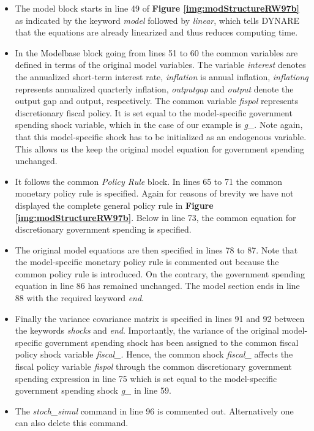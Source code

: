 \begin{itemize}
\item The model block starts in line 49 of {\bf Figure \ref{img:modStructureRW97b}} as indicated by the keyword \textit{model} followed
by \textit{linear}, which tells DYNARE that the equations are already linearized and thus reduces computing time.
\item In the Modelbase block going from lines 51 to 60 the common variables are defined in terms of the original model variables.
The variable \textit{interest} denotes the annualized short-term interest rate, \textit{inflation} is annual inflation,
\textit{inflationq} represents annualized quarterly inflation, \textit{outputgap} and \textit{output} denote the output gap and output, respectively.
The common variable \textit{fispol} represents discretionary fiscal policy. It is set equal to the model-specific government spending
shock variable, which in the case of our example is \textit{g\_}. Note again, that this model-specific shock has to be initialized
as an endogenous variable. This allows us the keep the original model equation for government spending unchanged.
\item It follows the common \textit{Policy Rule} block. In lines 65 to 71 the common monetary policy rule is specified.
Again for reasons of brevity we have not displayed the complete general policy rule in {\bf Figure \ref{img:modStructureRW97b}}.
Below in line 73, the common equation for discretionary government spending is specified.
\item The original model equations are then specified in lines 78 to 87. Note that the model-specific monetary policy rule is commented out because the common policy rule is introduced. On the contrary, the government spending equation in line 86 has remained unchanged.
The model section ends in line 88 with the required keyword \textit{end}.
\item Finally the variance covariance matrix is specified in lines 91 and 92 between the keywords \textit{shocks} and \textit{end}. Importantly, the variance of the original model-specific government spending shock has been assigned to the common fiscal policy shock variable \textit{fiscal\_}. Hence, the common shock \textit{fiscal\_} affects the fiscal policy variable \textit{fispol} through the common discretionary government spending expression in line 75 which is set equal to the model-specific government spending shock \textit{g\_} in line 59.
\item The \textit{stoch\_simul} command in line 96 is commented out. Alternatively one can also delete this command.
\end{itemize}